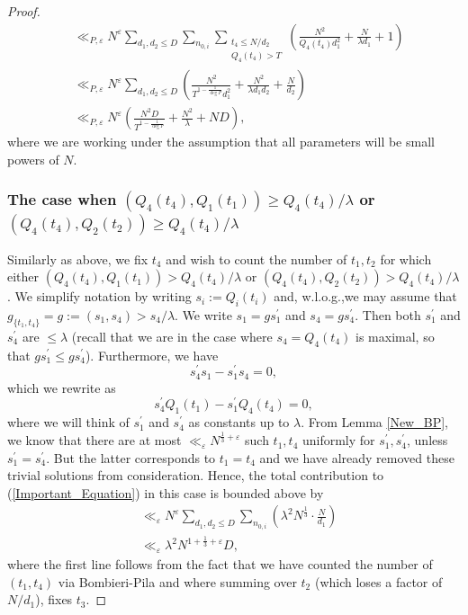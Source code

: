 \documentclass[11pts]{amsart}
\numberwithin{equation}{section}
\begin{document}
\begin{proof}
\begin{align}
                &\ll_{P,\varepsilon}
                N^{\varepsilon}
                \sum_{d_1,d_2\leq D}
                \sum_{n_{0,i}}\sum_{\substack{{t_4\leq N/d_2}\\{Q_4(t_4)>T}}}
                \left(\frac{N^2}{Q_4(t_4)d_1^2}
                +\frac{N}{\lambda d_1}
                +1\right)\\
                &\ll_{P,\varepsilon}
                N^{\varepsilon}
                \sum_{d_1,d_2\leq D}
                \left(\frac{N^2}{T^{1-\frac{1}{\deg P}}d_1^2}
                +\frac{N^2}{\lambda d_1d_2}
                +\frac{N}{d_2}\right)\\
                &\ll_{P,\varepsilon}
                N^{\varepsilon}
                \left(\frac{N^2D}{T^{1-\frac{1}{\deg P}}}
                +\frac{N^2}{\lambda}
                +ND\right),
            \end{align}
            where we are working under the assumption that all parameters will be small powers of $N$.
        
        
        
        \subsubsection{The case when $(Q_4(t_4),Q_1(t_1))\geq Q_4(t_4)/\lambda$ or $(Q_4(t_4),Q_2(t_2))\geq Q_4(t_4)/\lambda$} 
        
        Similarly as above, we fix $t_4$ and wish to count the number of $t_1,t_2$ for which either $(Q_4(t_4),Q_1(t_1))>Q_4(t_4)/\lambda$ or $(Q_4(t_4),Q_2(t_2))>Q_4(t_4)/\lambda$. We simplify notation by writing $s_i:=Q_i(t_i)$ and, w.l.o.g.,\;we may assume that $g_{\{t_1,t_4\}}=g:=(s_1,s_4)>s_4/\lambda$. We write $s_1=gs_1^\prime$ and $s_4=gs_4^\prime$. Then both $s_1^\prime$ and $s_4^\prime$ are $\leq \lambda$ (recall that we are in the case where $s_4=Q_4(t_4)$ is maximal, so that $gs_1^\prime\leq gs_4^\prime$). Furthermore, we have
    \[
    s_4^\prime s_1-s_1^\prime s_4 = 0,
    \]
    which we rewrite as 
    \[
    s_4^\prime Q_1(t_1)-s_1^\prime Q_4(t_4)=0,
    \]
where we will think of $s_1^\prime$ and $s_4^\prime$ as constants up to $\lambda$. From Lemma \ref{New_BP}, we know that there are at most $\ll_\varepsilon N^{\frac{1}{3} + \varepsilon}$ such $t_1,t_4$ uniformly for $s_1^\prime,s_4^\prime$, unless $s_1^\prime=s_4^\prime$. But the latter corresponds to $t_1=t_4$ and we have already removed these trivial solutions from consideration. Hence, the total contribution to (\ref{Important_Equation}) in this case is bounded above by
    \begin{align}
    \label{large_gcd}
        &\ll_\varepsilon 
        N^\varepsilon
        \sum_{d_1,d_2\leq D}
        \sum_{n_{0,i}}
        \left(\lambda^2 N^{\frac{1}{3}}
        \cdot \frac{N}{d_1}\right)\\
        &\ll_\varepsilon
        \lambda^2 N^{1+\frac{1}{3} + \varepsilon}D,
    \end{align}
where the first line follows from the fact that we have counted the number of $(t_1,t_4)$ via Bombieri-Pila and where summing over $t_2$ (which loses a factor of $N/d_1$), fixes $t_3$.   



\end{proof}
\end{document}
